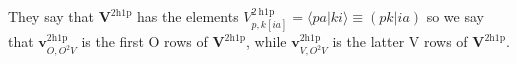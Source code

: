 They say that $\bm{V}^{2\mathrm{h1p}}$ has the  elements $V_{p, k[ia]}^{2 \mathrm{~h} 1 \mathrm{p}} = \langle p a | k i \rangle \equiv (pk|ia)$ so we say that $\bm{v}^{2\mathrm{h1p}}_{O,O^2V}$ is the first O rows of $\bm{V}^{2\mathrm{h1p}}$, while $\bm{v}^{2\mathrm{h1p}}_{V,O^2V}$ is the latter V rows of $\bm{V}^{2\mathrm{h1p}}$.
